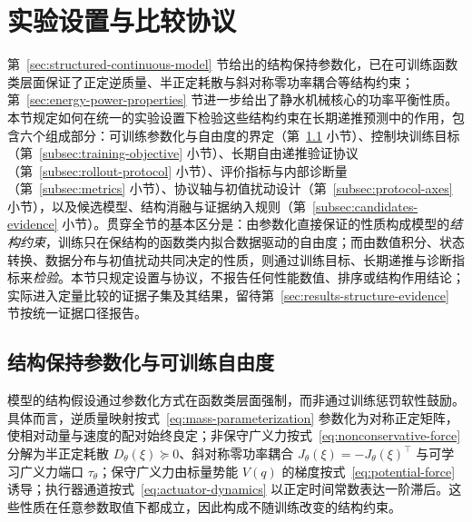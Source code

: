 
\section{实验设置与比较协议}
\label{sec:training-baselines-protocol}

第~\ref{sec:structured-continuous-model} 节给出的结构保持参数化，已在可训练函数类层面保证了正定逆质量、半正定耗散与斜对称零功率耦合等结构约束；第~\ref{sec:energy-power-properties} 节进一步给出了静水机械核心的功率平衡性质。本节规定如何在统一的实验设置下检验这些结构约束在长期递推预测中的作用，包含六个组成部分：可训练参数化与自由度的界定（第~\ref{subsec:structure-preserving-param} 小节）、控制块训练目标（第~\ref{subsec:training-objective} 小节）、长期自由递推验证协议（第~\ref{subsec:rollout-protocol} 小节）、评价指标与内部诊断量（第~\ref{subsec:metrics} 小节）、协议轴与初值扰动设计（第~\ref{subsec:protocol-axes} 小节），以及候选模型、结构消融与证据纳入规则（第~\ref{subsec:candidates-evidence} 小节）。贯穿全节的基本区分是：由参数化直接保证的性质构成模型的\emph{结构约束}，训练只在保结构的函数类内拟合数据驱动的自由度；而由数值积分、状态转换、数据分布与初值扰动共同决定的性质，则通过训练目标、长期递推与诊断指标来\emph{检验}。本节只规定设置与协议，不报告任何性能数值、排序或结构作用结论；实际进入定量比较的证据子集及其结果，留待第~\ref{sec:results-structure-evidence} 节按统一证据口径报告。

\subsection{结构保持参数化与可训练自由度}
\label{subsec:structure-preserving-param}

模型的结构假设通过参数化方式在函数类层面强制，而非通过训练惩罚软性鼓励。具体而言，逆质量映射按式~\eqref{eq:mass-parameterization} 参数化为对称正定矩阵，使相对动量与速度的配对始终良定；非保守广义力按式~\eqref{eq:nonconservative-force} 分解为半正定耗散 \(D_\theta(\xi)\succeq 0\)、斜对称零功率耦合 \(J_\theta(\xi)=-J_\theta(\xi)^\top\) 与可学习广义力端口 \(\tau_\theta\)；保守广义力由标量势能 \(V(q)\) 的梯度按式~\eqref{eq:potential-force} 诱导；执行器通道按式~\eqref{eq:actuator-dynamics} 以正定时间常数表达一阶滞后。这些性质在任意参数取值下都成立，因此构成不随训练改变的结构约束。

